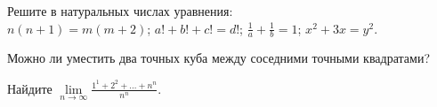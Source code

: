 \documentclass[a4paper,12pt]{article}
\begin{document}
Решите в натуральных числах уравнения:\\
$n(n+1)=m(m+2)$;
$a!+b!+c!=d!$;
$\frac1a+\frac1b=1$;
$x^2+3x=y^2$.

Можно ли уместить два точных куба между соседними точными квадратами?



 Найдите %
$\displaystyle{\lim\limits_{n\to\infty}\frac{1^1+2^2+\ldots+n^n}{n^n}}$.


\end{document}
